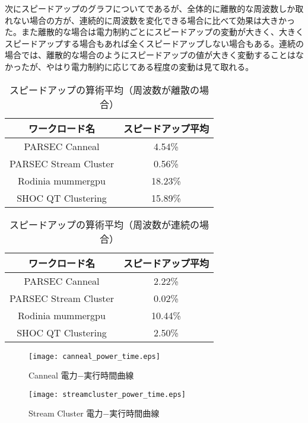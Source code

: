 次にスピードアップのグラフについてであるが、全体的に離散的な周波数しか取れない場合の方が、連続的に周波数を変化できる場合に比べて効果は大きかった。また離散的な場合は電力制約ごとにスピードアップの変動が大きく、大きくスピードアップする場合もあれば全くスピードアップしない場合もある。連続の場合では、離散的な場合のようにスピードアップの値が大きく変動することはなかったが、やはり電力制約に応じてある程度の変動は見て取れる。

\begin{table}[t]
\begin{center}\begin{tabular}{|c|c|}
\hline ワークロード名 & スピードアップ平均 \\
\hline PARSEC Canneal & 4.54\%\\
\hline PARSEC Stream Cluster & 0.56\%\\
\hline Rodinia mummergpu & 18.23\%\\
\hline SHOC QT Clustering & 15.89\%\\
\hline \end{tabular} \caption{スピードアップの算術平均（周波数が離散の場合）}\label{tbl:parsec}
\end{center}
\end{table}

\begin{table}[t]
\begin{center}\begin{tabular}{|c|c|}
\hline ワークロード名 & スピードアップ平均 \\
\hline PARSEC Canneal & 2.22\%\\
\hline PARSEC Stream Cluster & 0.02\%\\
\hline Rodinia mummergpu & 10.44\%\\
\hline SHOC QT Clustering & 2.50\%\\
\hline \end{tabular} \caption{スピードアップの算術平均（周波数が連続の場合）}\label{tbl:parsec}
\end{center}
\end{table}

\begin{figure}[t]
 \begin{center}
  \texttt{[image: canneal\_power\_time.eps]}
 \end{center}
 \caption{Canneal 電力−実行時間曲線}
 \label{fig:canneal_power_time}
\end{figure}

\begin{figure}[t]
 \begin{center}
  \texttt{[image: streamcluster\_power\_time.eps]}
 \end{center}
 \caption{Stream Cluster 電力−実行時間曲線}
 \label{fig:streamcluster_power_time}
\end{figure}

